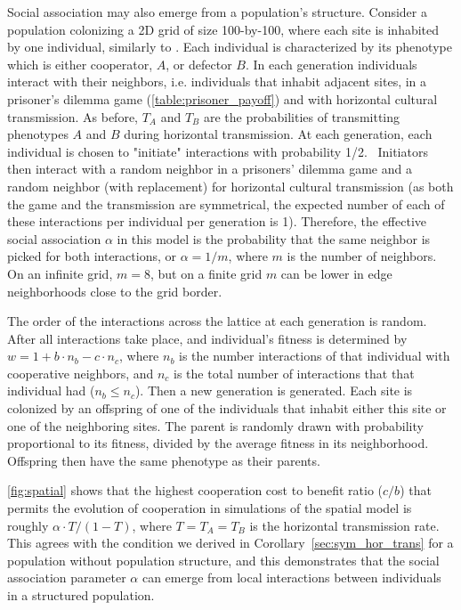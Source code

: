 \documentclass[12pt]{extarticle}
\begin{document}
{Social association may also emerge from a population's structure.
Consider a  population colonizing a 2D grid of size 100-by-100, where each site is inhabited by one individual, similarly to \citet{lewin2020rockpaperscissors}.
Each individual is characterized by its phenotype which is either cooperator, $A$, or defector $B$.
In each generation individuals interact with their neighbors, i.e. individuals that inhabit adjacent sites, in a prisoner's dilemma game (\autoref{table:prisoner_payoff}) and with horizontal cultural transmission.
As before, $T_A$ and $T_B$ are the probabilities of transmitting phenotypes $A$ and $B$ during horizontal transmission.
At each generation, each individual is chosen to "initiate" interactions with probability 1/2.\ %
Initiators then interact with a random neighbor in a prisoners' dilemma game and a random neighbor (with replacement) for horizontal cultural transmission (as both the game and the transmission are symmetrical, the expected number of each of these interactions per individual per generation is 1).
Therefore, the effective social association $\alpha$ in this model is the probability that the same neighbor is picked for both interactions, or $\alpha=1/m$, where $m$ is the number of neighbors. On an infinite grid, $m=8$, but on a finite grid $m$ can be lower in edge neighborhoods close to the grid border.

The order of the interactions across the lattice at each generation is random.
After all interactions take place, and individual's fitness is determined by
$w = 1 + b \cdot n_b - c \cdot n_c$,
where $n_b$ is the number interactions of that individual with cooperative neighbors, and $n_c$ is the total number of interactions that that individual  had ($n_b \le n_c$).
Then a new generation is generated.
Each site is colonized by an offspring of one of the individuals that inhabit either this site or one of the neighboring sites.
The parent is randomly drawn with probability proportional to its fitness, divided by the average fitness in its neighborhood.
Offspring then have the same phenotype as their parents.

\autoref{fig:spatial} shows that the highest cooperation cost to benefit ratio ($c/b$) that permits the evolution of cooperation in simulations of the spatial model is roughly $\alpha \cdot T / (1-T)$, where $T=T_A=T_B$ is the horizontal transmission rate. This agrees with the condition we derived in Corollary~\ref{sec:sym_hor_trans} for a population without population structure, and 
this demonstrates that the social association parameter $\alpha$ can emerge from local interactions between individuals in a structured population.


}
\end{document}
